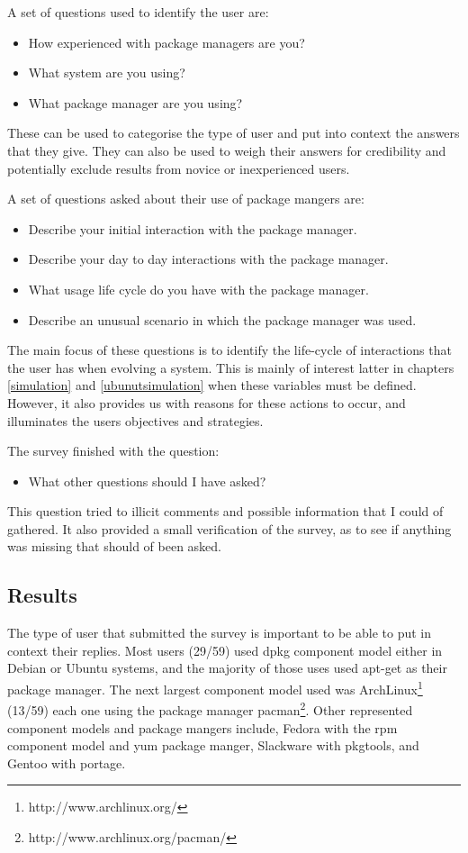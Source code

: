 A set of questions used to identify the user are:
\begin{itemize}
  \item How experienced with package managers are you? 
  \item What system are you using?
  \item What package manager are you using?
\end{itemize}
These can be used to categorise the type of user and put into context the answers that they give.
They can also be used to weigh their answers for credibility and potentially exclude results from novice or inexperienced users. 

A set of questions asked about their use of package mangers are:
\begin{itemize}
  \item Describe your initial interaction with the package manager.
  \item Describe your day to day interactions with the package manager.
  \item What usage life cycle do you have with the package manager.
  \item Describe an unusual scenario in which the package manager was used.
\end{itemize}
The main focus of these questions is to identify the life-cycle of interactions that the user has when evolving a system.
This is mainly of interest latter in chapters \ref{simulation} and \ref{ubunutsimulation} when these variables must be defined.
However, it also provides us with reasons for these actions to occur, and illuminates the users objectives and strategies.

The survey finished with the question:
\begin{itemize}
  \item What other questions should I have asked?
\end{itemize}
This question tried to illicit comments and possible information that I could of gathered.
It also provided a small verification of the survey, as to see if anything was missing that should of been asked.

\subsection{Results}
The type of user that submitted the survey is important to be able to put in context their replies.
Most users (29/59) used dpkg component model either in Debian or Ubuntu systems, and the majority of those uses used apt-get as their package manager.
The next largest component model used was ArchLinux\footnote{http://www.archlinux.org/} (13/59) each one using the package manager pacman\footnote{http://www.archlinux.org/pacman/}.
Other represented component models and package mangers include, Fedora with the rpm component model and yum package manger,
Slackware with pkgtools, and Gentoo with portage.

